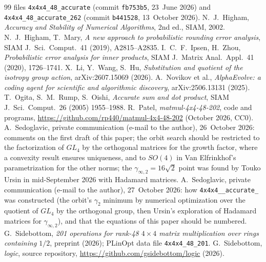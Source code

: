 \documentclass[11pt]{article}
\theoremstyle{remark}
\newcommand{\ginf}{\gamma_{\infty,2}}
\newcommand{\acct}{\texttt{4x4x4\_\allowbreak 48\_\allowbreak accurate\_\allowbreak 262}\xspace}
\begin{document}
{\begin{thebibliography}{99}
files \texttt{4x4x4\_48\_accurate} (commit \texttt{fb753b5}, 23~June
2026) and \texttt{4x4x4\_48\_accurate\_262} (commit \texttt{b441528},
13~October 2026).
 N.~J.~Higham, \emph{Accuracy and Stability of
Numerical Algorithms}, 2nd ed., SIAM, 2002.
 N.~J.~Higham, T.~Mary, \emph{A new approach to probabilistic
rounding error analysis}, SIAM J.\ Sci.\ Comput.\ 41 (2019), A2815--A2835.
 I.~C.~F.~Ipsen, H.~Zhou, \emph{Probabilistic error analysis for
inner products}, SIAM J.\ Matrix Anal.\ Appl.\ 41 (2020), 1726--1741.
 X.~Li, Y.~Wang, S.~Hu, \emph{Substitution and quotient
of the isotropy group action}, arXiv:2607.15069 (2026).
 A.~Novikov et al., \emph{AlphaEvolve: a coding agent
for scientific and algorithmic discovery}, arXiv:2506.13131 (2025).
 T.~Ogita, S.~M.~Rump, S.~Oishi, \emph{Accurate sum and
dot product}, SIAM J.\ Sci.\ Comput.\ 26 (2005) 1955--1988.
 R.~Patel, \emph{matmul-4x4-48-202}, code and programs,
\url{https://github.com/rp440/matmul-4x4-48-202} (October 2026, CC0).
 A.~Sedoglavic, private communication (e-mail
to the author), 26~October 2026: comments on the first draft of this
paper; the orbit search should be restricted to the factorization of
$GL_4$ by the orthogonal matrices for the growth factor, where a
convexity result ensures uniqueness, and to $SO(4)$ in Van Elfrinkhof's
parametrization for the other norms; the $\ginf=16\sqrt2$ point was
found by Touko Ursin in mid-September 2026 with Hadamard matrices.
 A.~Sedoglavic, private communication (e-mail
to the author), 27~October 2026: how \acct was constructed (the
orbit's $\gamma_2$ minimum by numerical optimization over the quotient
of $GL_4$ by the orthogonal group, then Ursin's exploration of Hadamard
matrices for $\ginf$), and that the equations of this paper should be
numbered.
 G.~Sidebottom, \emph{201 operations for rank-48 $4\times4$
matrix multiplication over rings containing $1/2$}, preprint (2026);
PLinOpt data file \texttt{4x4x4\_48\_201}.
 G.~Sidebottom, \emph{logic}, source repository,
\url{https://github.com/gsidebottom/logic} (2026).
\end{thebibliography}
}
\end{document}
